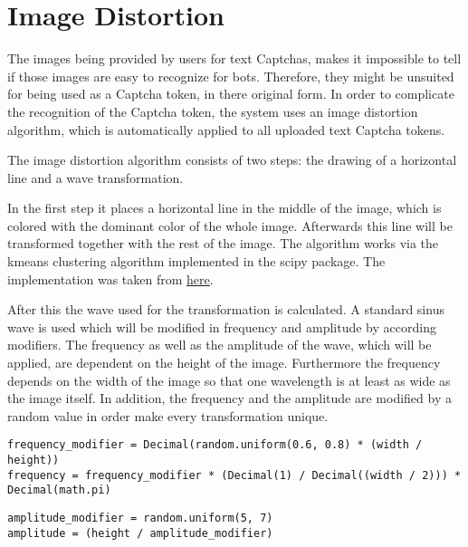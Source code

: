 \section{Image Distortion}
\label{sec:image_distortion}

The images being provided by users for text Captchas, makes it impossible to tell if those images are easy to recognize for bots. Therefore, they might be unsuited for being used as a Captcha token, in there original form. In order to complicate the recognition of the Captcha token, the system uses an image distortion algorithm, which is automatically applied to all uploaded text Captcha tokens.

The image distortion algorithm consists of two steps: the drawing of a horizontal line and a wave transformation.

In the first step it places a horizontal line in the middle of the image, which is colored with the dominant color of the whole image. Afterwards this line will be transformed together with the rest of the image.
The algorithm works via the kmeans clustering algorithm implemented in the scipy package. The implementation was taken from \href{http://stackoverflow.com/questions/3241929/python-find-dominant-most-common-color-in-an-image}{\underline{here}}.

After this the wave used for the transformation is calculated. A standard sinus wave is used which will be modified in frequency and amplitude by according modifiers. The frequency as well as the amplitude of the wave, which will be applied, are dependent on the height of the image. Furthermore the frequency depends on the width of the image so that one wavelength is at least as wide as the image itself. In addition, the frequency and the amplitude are modified by a random value in order make every transformation unique.\\

\begin{lstlisting}[style=std]
frequency_modifier = Decimal(random.uniform(0.6, 0.8) * (width / height))
frequency = frequency_modifier * (Decimal(1) / Decimal((width / 2))) * Decimal(math.pi)
\end{lstlisting}

\begin{lstlisting}[style=std]
amplitude_modifier = random.uniform(5, 7)
amplitude = (height / amplitude_modifier)
\end{lstlisting}

%

